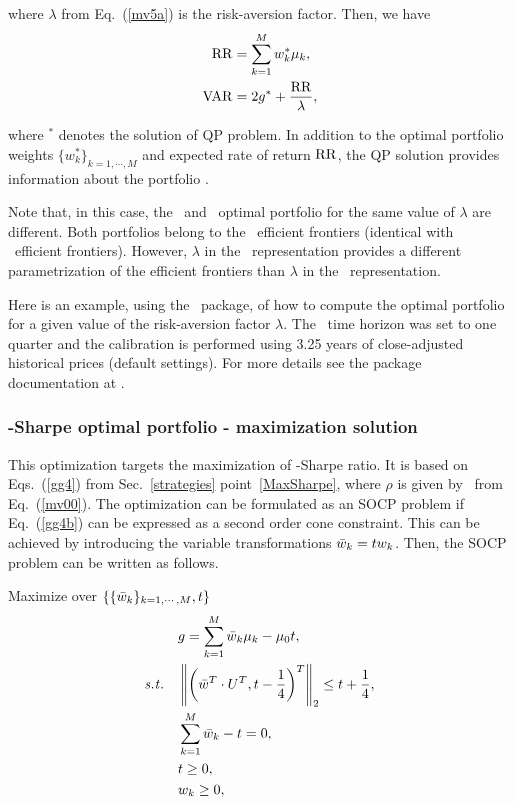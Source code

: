 \noindent where $\lambda$ from Eq.\ (\ref{mv5a}) is the risk-aversion factor.
Then, we have
\begin{subequations}\label{mv6}
\begin{align}
    \RR &= \sum_{k=1}^M w_k^* \mu_k, \label{mv6a} \\
    \VAR &= 2 g^* + \frac{\RR}{\lambda}, \label{mv6b}
\end{align}
\end{subequations}

\noindent where $^*$ denotes the solution of QP problem.
In addition to the optimal portfolio weights $\{w_k^*\}_{k=1,\cdots,M}$ and expected rate of return ${\rm RR}$, the
QP solution provides information about the portfolio \VAR.

Note that, in this case, the \SD\ and \MV\ optimal portfolio for the same value of $\lambda$ are different.
Both portfolios belong to the \MV\ efficient frontiers (identical with \SD\ efficient frontiers). However, $\lambda$
in the \MV\ representation provides a different parametrization of the efficient frontiers than $\lambda$ in the
\SD\ representation.

\bigskip
\noindent Here is an example, using the \azapy\ package, of how to compute the optimal portfolio
for a given value of the risk-aversion factor $\lambda$.
The \VAR\ time horizon was set to one quarter and the calibration is performed using 3.25 years of
close-adjusted historical prices (default settings).
For more details see the package documentation at \azapydoc.



\BackToContents


\subsubsection{\MV-Sharpe optimal portfolio - maximization solution}
This optimization targets the maximization of \MV-Sharpe ratio. It is based on
Eqs.~(\ref{gg4}) from Sec.~\ref{strategies} point~\ref{MaxSharpe},
where $\rho$ is given by \VAR\ from Eq.~(\ref{mv00}).
The optimization can be formulated as an SOCP problem
if Eq.~(\ref{gg4b}) can be expressed as a second order cone constraint.
This can be achieved by
introducing the variable transformations
${\bar w}_k = t w_k$. Then, the SOCP problem can be written as follows.

\bigskip
\noindent Maximize over $\{ \{ {\bar w}_k\}_{k=1,\cdots,M}, t\}$
\begin{subequations}\label{mv7}
\begin{align}
    & g = \sum_{k=1}^M \bw_k \mu_k - \mu_0 t, \label{mv7a} \\
    \st & \left\| \left(\bw^T \cdot U^T , t - \frac{1}{4} \right)^T \right\|_2 \leq t + \frac{1}{4}, \label{mv7b} \\
        & \sum_{k=1}^M \bw_k - t = 0, \label{mv7c} \\
        & t \geq 0, \label{mv7e} \\
        & w_k \geq 0, \label{mv7d}
\end{align}
\end{subequations}

